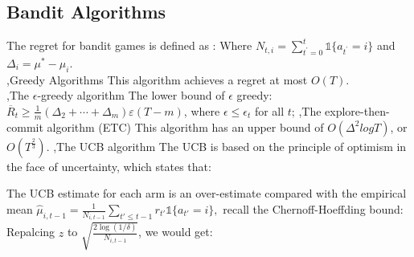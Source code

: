 \documentclass[10pt]{report}
\begin{document}
\subsection{Bandit Algorithms}

The regret for bandit games is defined as :
Where $N_{t,i}=\sum_{t^{\prime}=0}^{t}\mathbb{1}\{a_{t^{\prime}}=i\}$ and $\Delta_{i}=\mu^{*}-\mu_{i}$.\\
\sep{Greedy Algorithms}
This algorithm achieves a regret at most $O(T)$.\\
\sep{The $\epsilon$-greedy algorithm}
The lower bound of $\epsilon$ greedy: $\overline{R}_t\geq\frac1m(\Delta_2+\cdots+\Delta_m)\varepsilon(T-m)$, where $\epsilon\le \epsilon_t$ for all $t$;
\sep{The explore-then-commit algorithm (ETC)}
This algorithm has an upper bound of $O(\Delta^2 log T)$, or $O(T^{\frac{2}{3}})$.
\sep{The UCB algorithm}
The UCB is based on the principle of optimism in the face of uncertainty, which states that:
\begin{center}
\end{center}
The UCB estimate for each arm is an over-estimate compared with the empirical mean $\hat{\mu}_{i,t-1}=\frac{1}{N_{i,t-1}}\sum_{t'\le t-1}r_{t'}\mathbb{1}\{a_{t'}=i\},$ recall the Chernoff-Hoeffding bound:
Repalcing $z$ to $\sqrt{\frac{2\log(1/\delta)}{N_{i,t-1}}}$, we would get:
\end{document}
